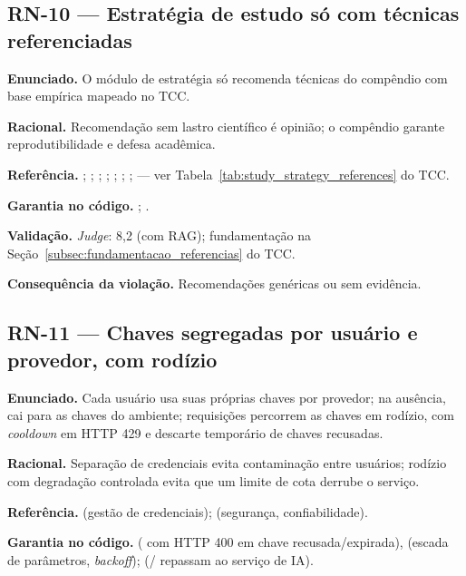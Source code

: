\subsection{RN-10 --- Estratégia de estudo só com técnicas referenciadas}

\textbf{Enunciado.} O módulo de estratégia só recomenda técnicas do compêndio com base empírica mapeado no TCC.

\textbf{Racional.} Recomendação sem lastro científico é opinião; o compêndio garante reprodutibilidade e defesa acadêmica.

\textbf{Referência.} ; ; ; ; ; ; ;  --- ver Tabela~\ref{tab:study_strategy_references} do TCC.

\textbf{Garantia no código.} ; \texttt{}.

\textbf{Validação.} \emph{Judge}: 8,2 (com RAG); fundamentação na Seção~\ref{subsec:fundamentacao_referencias} do TCC.

\textbf{Consequência da violação.} Recomendações genéricas ou sem evidência.

\subsection{RN-11 --- Chaves segregadas por usuário e provedor, com rodízio}

\textbf{Enunciado.} Cada usuário usa suas próprias chaves por provedor; na ausência, cai para as chaves do ambiente; requisições percorrem as chaves em rodízio, com \emph{cooldown} em HTTP 429 e descarte temporário de chaves recusadas.

\textbf{Racional.} Separação de credenciais evita contaminação entre usuários; rodízio com degradação controlada evita que um limite de cota derrube o serviço.

\textbf{Referência.} \cite{owasp_asvs_2021} (gestão de credenciais); \cite{iso_25010} (segurança, confiabilidade).

\textbf{Garantia no código.}  (\texttt{} com HTTP 400 em chave recusada/expirada),  (escada de parâmetros, \emph{backoff});  (\texttt{}/\texttt{} repassam \texttt{} ao serviço de IA).

